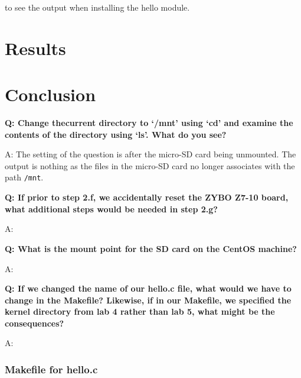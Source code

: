 \documentclass[11pt,letterpaper,titlepage]{article}
\begin{document}
\begin{enumerate}
\begin{enumerate}
        
        
        
        
        to see the output when installing the hello module.
        
    \end{enumerate}
    
    
    
\end{enumerate}

\newpage

\part{Results}



\newpage

\part{Conclusion}

\textbf{Q: Change thecurrent directory to `/mnt' using `cd' and examine the contents of the directory using `ls'. What do you see?}

A: The setting of the question is after the micro-SD card being unmounted. The output is nothing as the files in the micro-SD card no longer associates with the path \verb|/mnt|.

\textbf{Q: If prior to step 2.f, we accidentally reset the ZYBO Z7-10 board, what additional steps would be
needed in step 2.g?}

A: 

\textbf{Q: What is the mount point for the SD card on the CentOS machine?}

A:

\textbf{Q: If we changed the name of our hello.c file, what would we have to change in the Makefile? Likewise, if in our Makefile, we specified the kernel directory from lab 4 rather than lab 5, what
might be the consequences?}

A: 

\newpage

\begin{appendices}

\end{appendices}

\section{Makefile for hello.c}
\label{appendix:makefile_hello}

\end{document}
